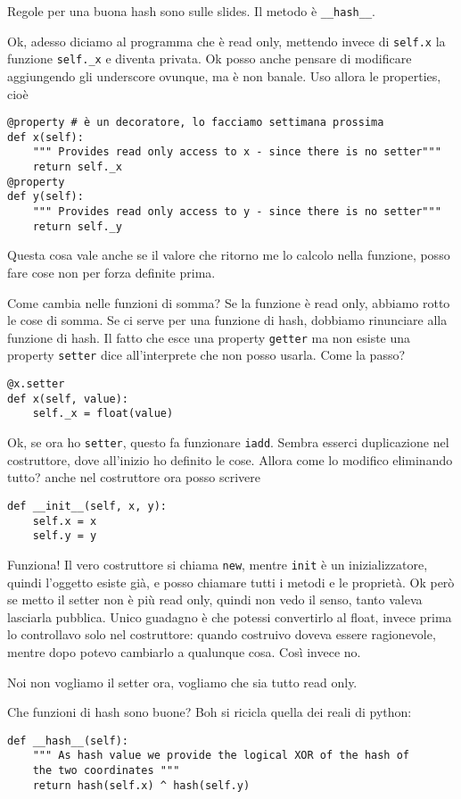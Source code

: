 \documentclass[10pt, a4paper, titlepage]{book}
\begin{document}
Regole per una buona hash sono sulle slides. Il metodo è \texttt{__hash__}.

Ok, adesso diciamo al programma che è read only, mettendo invece di \texttt{self.x} la funzione \texttt{self._x} e diventa privata. Ok posso anche pensare di modificare aggiungendo gli underscore ovunque, ma è non banale. 
Uso allora le properties, cioè
\begin{verbatim}
@property # è un decoratore, lo facciamo settimana prossima
def x(self):
	""" Provides read only access to x - since there is no setter"""
	return self._x
@property
def y(self):
	""" Provides read only access to y - since there is no setter"""
	return self._y 	
\end{verbatim}

Questa cosa vale anche se il valore che ritorno me lo calcolo nella funzione, posso fare cose non per forza definite prima.

Come cambia nelle funzioni di somma?
Se la funzione è read only, abbiamo rotto le cose di somma. Se ci serve per una funzione di hash, dobbiamo rinunciare alla funzione di hash.
Il fatto che esce una property \texttt{getter} ma non esiste una property \texttt{setter} dice all'interprete che non posso usarla. Come la passo?
\begin{verbatim}
@x.setter
def x(self, value):
	self._x = float(value)
\end{verbatim}

Ok, se ora ho \texttt{setter}, questo fa funzionare \texttt{iadd}. Sembra esserci duplicazione nel costruttore, dove all'inizio ho definito le cose. Allora come lo modifico eliminando tutto? anche nel costruttore ora posso scrivere
\begin{verbatim}
def __init__(self, x, y):
	self.x = x
	self.y = y	
\end{verbatim}

Funziona!
Il vero costruttore si chiama \texttt{new}, mentre \texttt{init} è un inizializzatore, quindi l'oggetto esiste già, e posso chiamare tutti i metodi e le proprietà.
Ok però se metto il setter non è più read only, quindi non vedo il senso, tanto valeva lasciarla pubblica. Unico guadagno è che potessi convertirlo al float, invece prima lo controllavo solo nel costruttore: quando costruivo doveva essere ragionevole, mentre dopo potevo cambiarlo a qualunque cosa. 
Così invece no.

Noi non vogliamo il setter ora, vogliamo che sia tutto read only.

Che funzioni di hash sono buone? Boh si ricicla quella dei reali di python:
\begin{verbatim}
def __hash__(self):
	""" As hash value we provide the logical XOR of the hash of 
	the two coordinates """
	return hash(self.x) ^ hash(self.y)	
\end{verbatim}
\end{document}
